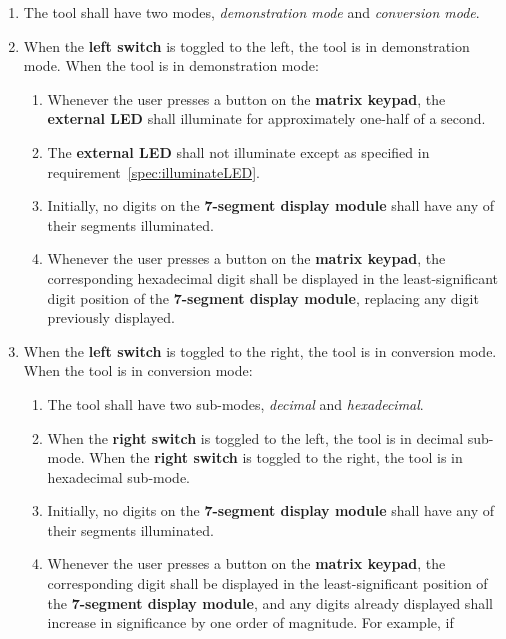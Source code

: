 \begin{enumerate}
\item The tool shall have two modes, \textit{demonstration mode} and
    \textit{conversion mode}.
\item When the \textbf{left switch} is toggled to the left, the tool is in
    demonstration mode. When the tool is in demonstration mode:
    \begin{enumerate}
    \item \label{spec:illuminateLED} Whenever the user presses a button on the
        \textbf{matrix keypad}, the \textbf{external LED} shall illuminate for
        approximately one-half of a second.
    \item The \textbf{external LED} shall not illuminate except as specified in
        requirement~\ref{spec:illuminateLED}.
    \item Initially, no digits on the \textbf{7-segment display module} shall
        have any of their segments illuminated.
    \item Whenever the user presses a button on the \textbf{matrix keypad}, the
        corresponding hexadecimal digit shall be displayed in the
        least-significant digit position of the \textbf{7-segment display
        module}, replacing any digit previously displayed.
    \end{enumerate}
\item \label{spec:ConversionMode} When the \textbf{left switch} is toggled to
    the right, the tool is in conversion mode. When the tool is in conversion
    mode:
    \begin{enumerate}
    \item The tool shall have two sub-modes, \textit{decimal} and
    \textit{hexadecimal}.
    \item When the \textbf{right switch} is toggled to the left, the tool is in
         decimal sub-mode. When the \textbf{right switch} is toggled to the
        right, the tool is in hexadecimal sub-mode.
    \item Initially, no digits on the \textbf{7-segment display module} shall
        have any of their segments illuminated.
    \item \label{spec:BuildingValue} Whenever the user presses a button on the
        \textbf{matrix keypad}, the corresponding digit shall be displayed in
        the least-significant position of the \textbf{7-segment display
        module}, and any digits already displayed shall increase in
        significance by one order of magnitude. For example, if {}

\end{enumerate}
\end{enumerate}
